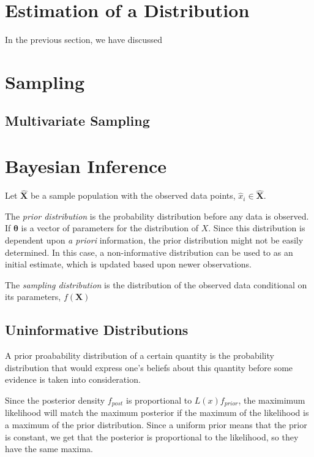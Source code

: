 \section{Estimation of a Distribution}

In the previous section, we have discussed

\section{Sampling}

\subsection{Multivariate Sampling}
\label{section:multivariate_sampling}

\section{Bayesian Inference}
\label{section:bayes}

Let $\hat{\bm{X}}$ be a sample population with the observed data points, $\hat{x}_i \in \hat{\bm{X}}$.

The \emph{prior distribution} is the probability distribution before any data is observed.  If $\bm{\theta}$ is a vector of parameters for the distribution of $X$.   Since this distribution is dependent upon \emph{a priori} information, the prior distribution might not be easily determined.  In this case, a non-informative distribution can be used to as an initial estimate, which is updated based upon newer observations.

The \emph{sampling distribution} is the distribution of the observed data conditional on its parameters, $f(\bm{X})$

\subsection{Uninformative Distributions}
\label{section:bayes_prior}
A prior proabability distribution of a certain  quantity is the probability distribution that would express one's beliefs about this quantity before some evidence is taken into consideration.

Since the posterior density $f_{post}$ is proportional to $L(x)f_{prior}$, the maximimum likelihood will match the maximum posterior if the maximum of the likelihood is a maximum of the prior distribution.  Since a uniform prior means that the prior is constant, we get that the posterior is proportional to the likelihood, so they have the same maxima.

